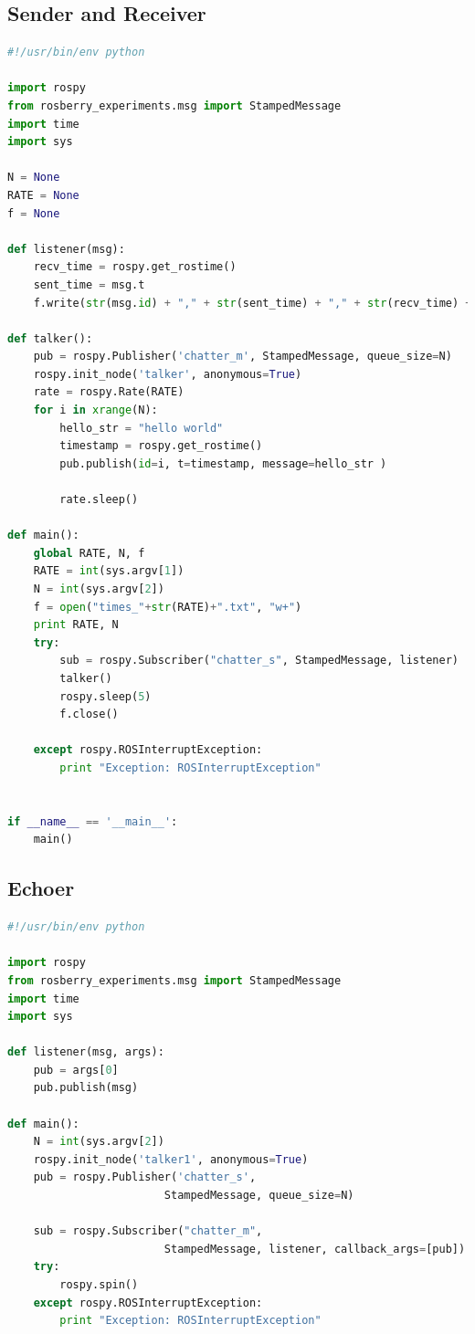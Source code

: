 \documentclass{l4proj}
\begin{document}
\begin{appendices}
\subsection{Sender and Receiver}
\begin{lstlisting}[language=Python]
#!/usr/bin/env python

import rospy
from rosberry_experiments.msg import StampedMessage
import time
import sys

N = None
RATE = None
f = None

def listener(msg):
    recv_time = rospy.get_rostime()
    sent_time = msg.t
    f.write(str(msg.id) + "," + str(sent_time) + "," + str(recv_time) + "\n")

def talker():
    pub = rospy.Publisher('chatter_m', StampedMessage, queue_size=N)
    rospy.init_node('talker', anonymous=True)
    rate = rospy.Rate(RATE)
    for i in xrange(N):
        hello_str = "hello world"
        timestamp = rospy.get_rostime()
        pub.publish(id=i, t=timestamp, message=hello_str )

        rate.sleep()

def main():
    global RATE, N, f
    RATE = int(sys.argv[1])
    N = int(sys.argv[2])
    f = open("times_"+str(RATE)+".txt", "w+")
    print RATE, N
    try:
        sub = rospy.Subscriber("chatter_s", StampedMessage, listener)
        talker()
        rospy.sleep(5)
        f.close()

    except rospy.ROSInterruptException:
        print "Exception: ROSInterruptException"


if __name__ == '__main__':
    main()
\end{lstlisting}

\subsection{Echoer}
\begin{lstlisting}[language=Python]
#!/usr/bin/env python

import rospy
from rosberry_experiments.msg import StampedMessage
import time
import sys

def listener(msg, args):
    pub = args[0]
    pub.publish(msg)

def main():
    N = int(sys.argv[2])
    rospy.init_node('talker1', anonymous=True)
    pub = rospy.Publisher('chatter_s',
						StampedMessage, queue_size=N)

    sub = rospy.Subscriber("chatter_m",
						StampedMessage, listener, callback_args=[pub])
    try:
        rospy.spin()
    except rospy.ROSInterruptException:
        print "Exception: ROSInterruptException"


\end{lstlisting}
\end{appendices}
\end{document}
